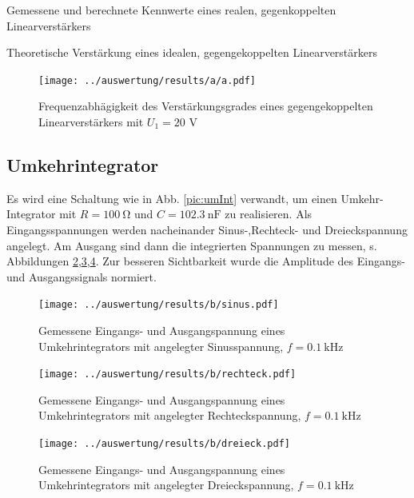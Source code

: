 \begin{table}
	\centering
	\caption{Gemessene und berechnete Kennwerte eines realen, gegenkoppelten Linearverstärkers}
	
	\label{table:a_real}
\end{table}

\begin{table}
	\centering
	
	\caption{Theoretische Verstärkung eines idealen, gegengekoppelten Linearverstärkers}
	\label{table:a_theorie}
\end{table}

\begin{figure}
	\centering
	\texttt{[image: ../auswertung/results/a/a.pdf]}
	\caption{Frequenzabhägigkeit des Verstärkungsgrades eines gegengekoppelten Linearverstärkers mit $U_1 = 20$ V}
	\label{pic:a plot}
\end{figure}

\subsection{Umkehrintegrator}
Es wird eine Schaltung wie in Abb. \ref{pic:umInt} verwandt, um einen Umkehr-Integrator mit $R = 100\ \si{\ohm}$ und $C = 102.3\ \si{\nano\farad}$ zu realisieren. Als Eingangsspannungen werden nacheinander Sinus-,Rechteck- und Dreieckspannung angelegt. Am Ausgang sind dann die integrierten Spannungen zu messen, s. Abbildungen \ref{pic:b sinus},\ref{pic:b rechteck},\ref{pic:b dreieck}. Zur besseren Sichtbarkeit wurde die Amplitude des Eingangs- und Ausgangssignals normiert.

\begin{figure}
	\centering
	\texttt{[image: ../auswertung/results/b/sinus.pdf]}
	\caption{Gemessene Eingangs- und Ausgangspannung eines Umkehrintegrators mit angelegter Sinusspannung, $f = 0.1\ \si{\kilo\hertz}$}
	\label{pic:b sinus}
\end{figure}

\begin{figure}
	\centering
	\texttt{[image: ../auswertung/results/b/rechteck.pdf]}
	\caption{Gemessene Eingangs- und Ausgangspannung eines Umkehrintegrators mit angelegter Rechteckspannung, $f = 0.1\ \si{\kilo\hertz}$}
	\label{pic:b rechteck}
\end{figure}

\begin{figure}
	\centering
	\texttt{[image: ../auswertung/results/b/dreieck.pdf]}
	\caption{Gemessene Eingangs- und Ausgangspannung eines Umkehrintegrators mit angelegter Dreieckspannung, $f = 0.1\ \si{\kilo\hertz}$}
	\label{pic:b dreieck}
\end{figure}

